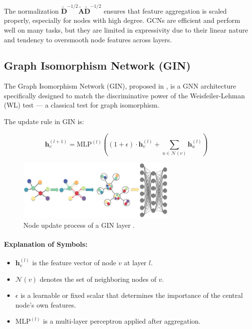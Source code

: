\documentclass[11pt,a4paper]{article}
\begin{document}
	The normalization $\mathbf{\tilde{D}}^{-1/2} \mathbf{\tilde{A}} \mathbf{\tilde{D}}^{-1/2}$ ensures that feature aggregation is scaled properly, especially for nodes with high degree. GCNs are efficient and perform well on many tasks, but they are limited in expressivity due to their linear nature and tendency to oversmooth node features across layers.
	
	\subsection{Graph Isomorphism Network (GIN)}
	
	The Graph Isomorphism Network (GIN), proposed in \cite{xu2019powerful}, is a GNN architecture specifically designed to match the discriminative power of the Weisfeiler-Lehman (WL) test — a classical test for graph isomorphism.
	
	The update rule in GIN is:
	
	\begin{equation}
		\mathbf{h}_v^{(l+1)} = \text{MLP}^{(l)} \left( (1 + \epsilon) \cdot \mathbf{h}_v^{(l)} + \sum_{u \in \mathcal{N}(v)} \mathbf{h}_u^{(l)} \right)
	\end{equation}
	
	\begin{figure}[h]
		\centering
		\includegraphics[width=0.7\textwidth]{gin.png}
		\caption{Node update process of a  GIN layer \cite{pic:gin}.}
	\end{figure}

	\paragraph{Explanation of Symbols:}
	\begin{itemize}
		\item $\mathbf{h}_v^{(l)}$ is the feature vector of node $v$ at layer $l$.
		\item $\mathcal{N}(v)$ denotes the set of neighboring nodes of $v$.
		\item $\epsilon$ is a learnable or fixed scalar that determines the importance of the central node's own features.
		\item $\text{MLP}^{(l)}$ is a multi-layer perceptron applied after aggregation.
	\end{itemize}
	
\end{document}
